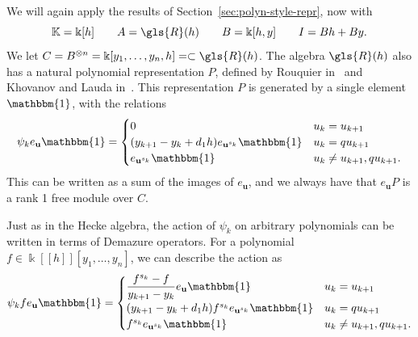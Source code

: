 \documentclass[ALCO,ThmDefs,Unicode,epreuves]{cedram}
\newcommand{\bone}{\mathbbm{1}}
\newcommand{\K}{\Bbbk}%
\newcommand{\Bu}{\mathbf{u}}
\newcommand\llbracket{[\![}
\newcommand\rrbracket{]\!]}
\begin{document}
 
We will again apply the results of Section~\ref{sec:polyn-style-repr},
now with 
\begin{equation}
\mathbb{K}=\K[h]\qquad A=\gls{R}(h)\qquad
 B=\K[h,y]\qquad I=Bh+By.\label{eq:KLR-PR}
\end{equation}
We let $C=B^{\otimes n}=\K[y_1,\dots,y_n,h]=\subset \gls{R}(h)$.
The algebra $\gls{R}(h)$ also has a natural polynomial representation $P$, defined
by Rouquier
in~\cite[\S~3.2]{Rou2KM} and Khovanov and Lauda in~\cite[\S~2.3]{KLI}.
 This representation $P$ is generated
by a single element $\bone$, with the relations
\[ \psi_ke_{\Bu}\bone=
\begin{cases}
 0 & u_k=u_{k+1}\\
 (y_{k+1}-y_k+d_1h)e_{\Bu^{s_k}}\bone & u_k=qu_{k+1}\\
 e_{\Bu^{s_k}}\bone & u_k\neq u_{k+1},qu_{k+1}.
\end{cases}
\]
This can be written as a sum of the images of $e_{\Bu}$, and we always
have that $e_{\Bu}P$ is a rank 1 free module over
$C$. 

Just as in the Hecke algebra, the action of $\psi_k$ on arbitrary
polynomials can be written in terms of Demazure operators. For a
polynomial $f\in \K\llbracket h\rrbracket [y_1,\dots, y_n]$, we can describe the action
as 
\begin{equation}
 \psi_k f e_{\Bu}\bone=
\begin{cases}
 \displaystyle \frac{f^{s_k}-f}{y_{k+1}-y_k} e_{\Bu}\bone& u_k=u_{k+1}\\
 (y_{k+1}-y_k+d_1h)f^{s_k}e_{\Bu^{s_k}}\bone & u_k=qu_{k+1}\\
 f^{s_k} e_{\Bu^{s_k}}\bone & u_k\neq u_{k+1},qu_{k+1}.
\end{cases}\label{eq:KLR-action}
\end{equation}
\end{document}
